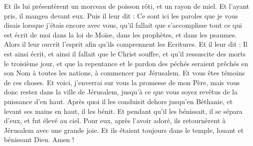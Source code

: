 \begin{multicols}{2}
Et ils lui présentèrent un morceau de poisson rôti, et un rayon de miel.
Et l'ayant pris, il mangea devant eux.
Puis il leur dit : Ce sont ici les paroles que je vous disais lorsque j'étais encore avec vous, qu'il fallait que s'accomplisse tout ce qui est écrit de moi dans la loi de Moïse, dans les prophètes, et dans les psaumes.
Alors il leur ouvrit l'esprit afin qu'ils comprennent les Ecritures.
Et il leur dit : Il est ainsi écrit, et ainsi il fallait que le Christ souffre, et qu'il ressuscite des morts le troisième jour,
et que la repentance et le pardon des péchés seraient prêchés en son Nom à toutes les nations, à commencer par Jérusalem.
Et vous êtes témoins de ces choses. 
Et voici, j'enverrai sur vous la promesse de mon Père, mais vous donc restez dans la ville de Jérusalem, jusqu'à ce que vous soyez revêtus de la puissance d'en haut.
Après quoi il les conduisit dehors jusqu'en Béthanie, et levant ses mains en haut, il les bénit.
Et pendant qu'il les bénissait, il se sépara d'eux, et fut élevé au ciel.
Pour eux, après l'avoir adoré, ils retournèrent à Jérusalem avec une grande joie.
Et ils étaient toujours dans le temple, louant et bénissant Dieu. Amen !
\PPE{}
\end{multicols}

